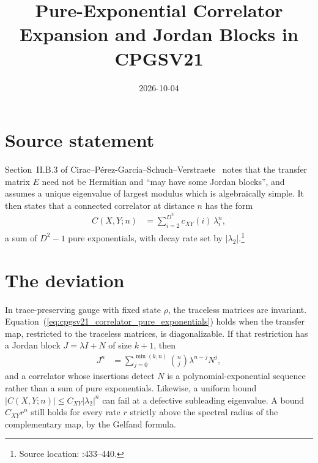\documentclass{article}
\title{Pure-Exponential Correlator Expansion and Jordan Blocks in CPGSV21}
\author{}
\date{2026-10-04}
\begin{document}
\maketitle
{}

\section{Source statement}

Section~II.B.3 of Cirac--P\'erez-Garc\'ia--Schuch--Verstraete~\cite{Cirac2021Matrix}
notes that the transfer matrix $E$ need not be Hermitian and ``may have some
Jordan blocks'', and assumes a unique eigenvalue of largest modulus which
is algebraically simple.
It then states that a connected correlator at distance $n$ has the form
\begin{align}
    C(X,Y;n) & =\sum_{i=2}^{D^2} c_{XY}(i)\,\lambda_i^n,
    \label{eq:cpgsv21_correlator_pure_exponentials}
\end{align}
a sum of $D^2-1$ pure exponentials, with decay rate set by
$|\lambda_2|$.\footnote{Source location:
    :433--440.}

\section{The deviation}

In trace-preserving gauge with fixed state $\rho$, the traceless matrices
are invariant.
Equation~(\ref{eq:cpgsv21_correlator_pure_exponentials}) holds when the
transfer map, restricted to the traceless matrices, is diagonalizable. If that
restriction has a Jordan block $J=\lambda I+N$ of size $k+1$, then
\begin{align}
    J^n & =\sum_{j=0}^{\min(k,n)}\binom nj\lambda^{n-j}N^j,
    \label{eq:cpgsv21_correlator_jordan_power}
\end{align}
and a correlator whose insertions detect $N$ is a polynomial-exponential
sequence rather than a sum of pure exponentials. Likewise, a uniform bound $|C(X,Y;n)|\le C_{XY}|\lambda_2|^n$
can fail at a defective subleading eigenvalue. A bound $C_{XY}r^n$ still holds
for every rate $r$ strictly above the spectral radius of the complementary map,
by the Gelfand formula.
\end{document}
